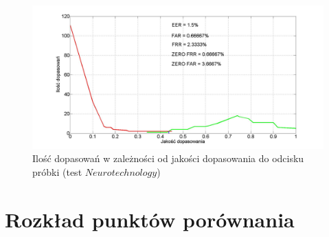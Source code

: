 \begin{figure}[!hbt]
    \begin{center}
		\includegraphics[angle=0,scale=0.27]{img/sample_line_statistic_analyses_ob_way.jpg}
		\caption{Ilość dopasowań w zależności od jakości dopasowania do odcisku próbki (test $Neurotechnology$)}
		\label{img:ob_stat_line_sample}
    \end{center}
\end{figure} 

\newpage 
\section[Rozkład punktów porównania][Rozkład punktów porównania]{Rozkład punktów porównania}

